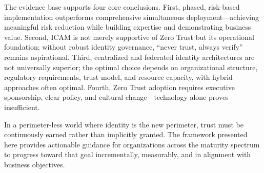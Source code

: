 \documentclass[journal]{IEEEtran}
\begin{document}
The evidence base supports four core conclusions. First, phased, risk-based
implementation outperforms comprehensive simultaneous deployment---achieving meaningful
risk reduction while building expertise and demonstrating business value. Second, ICAM is
not merely supportive of Zero Trust but its operational foundation; without robust
identity governance, ``never trust, always verify'' remains aspirational. Third,
centralized and federated identity architectures are not universally superior; the
optimal choice depends on organizational structure, regulatory requirements, trust model,
and resource capacity, with hybrid approaches often optimal. Fourth, Zero Trust adoption
requires executive sponsorship, clear policy, and cultural change---technology alone
proves insufficient.

In a perimeter-less world where identity is the new perimeter, trust must be continuously
earned rather than implicitly granted. The framework presented here provides actionable
guidance for organizations across the maturity spectrum to progress toward that goal
incrementally, measurably, and in alignment with business objectives.
\end{document}
